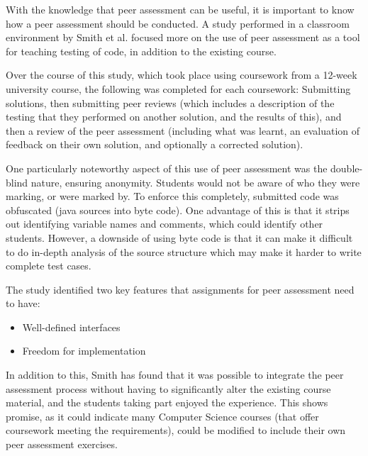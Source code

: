 \documentclass[a4paper,11pt]{report}
\begin{document}
With the knowledge that peer assessment can be useful, it is important to know how a peer assessment should be conducted. A study performed in a classroom environment by Smith et al.\cite{smith_using_2012} focused more on the use of peer assessment as a tool for teaching testing of code, in addition to the existing course.\par
Over the course of this study, which took place using coursework from a 12-week university course, the following was completed for each coursework: Submitting solutions, then submitting peer reviews (which includes a description of the testing that they performed on another solution, and the results of this), and then a review of the peer assessment (including what was learnt, an evaluation of feedback on their own solution, and optionally a corrected solution).\par
One particularly noteworthy aspect of this use of peer assessment was the double-blind nature, ensuring anonymity. Students would not be aware of who they were marking, or were marked by. To enforce this completely, submitted code was obfuscated (java sources into byte code). One advantage of this is that it strips out identifying variable names and comments, which could identify other students. However, a downside of using byte code is that it can make it difficult to do in-depth analysis of the source structure which may make it harder to write complete test cases.\par
The study identified two key features that assignments for peer assessment need to have:
\begin{itemize}
 \item Well-defined interfaces
 \item Freedom for implementation
\end{itemize}
In addition to this, Smith has found that it was possible to integrate the peer assessment process without having to significantly alter the existing course material, and the students taking part enjoyed the experience. This shows promise, as it could indicate many Computer Science courses (that offer coursework meeting the requirements), could be modified to include their own peer assessment exercises.\par
\end{document}
